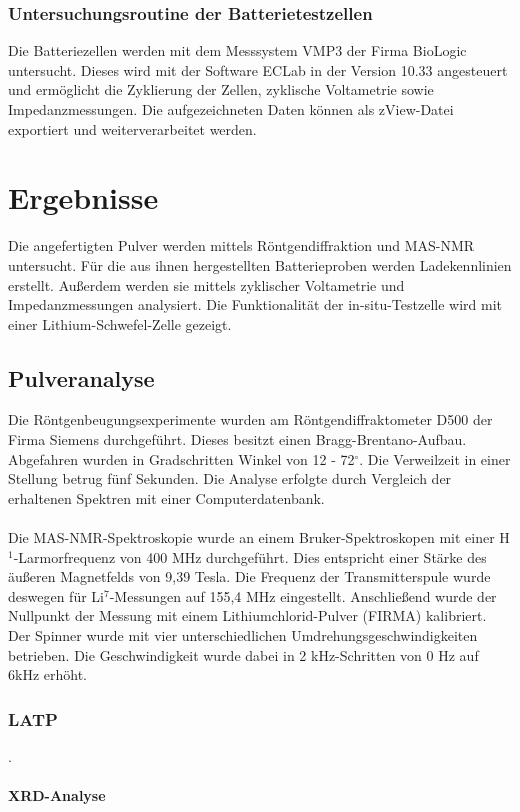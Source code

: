 \documentclass[a4paper, 11pt, headsepline,footsepline,twoside,abstract]{scrbook}
\begin{document}
\subsection{Untersuchungsroutine der Batterietestzellen} %
Die Batteriezellen werden mit dem Messsystem VMP3 der Firma BioLogic untersucht. Dieses wird mit der Software ECLab in der Version 10.33 angesteuert und ermöglicht die Zyklierung der Zellen, zyklische Voltametrie sowie Impedanzmessungen. Die aufgezeichneten Daten können als zView-Datei exportiert und weiterverarbeitet werden.
\chapter{Ergebnisse}
Die angefertigten Pulver werden mittels Röntgendiffraktion und MAS-NMR untersucht. Für die aus ihnen hergestellten Batterieproben werden Ladekennlinien erstellt. Außerdem werden sie mittels zyklischer Voltametrie und Impedanzmessungen analysiert. Die Funktionalität der in-situ-Testzelle wird mit einer Lithium-Schwefel-Zelle gezeigt.
\section{Pulveranalyse}
Die Röntgenbeugungsexperimente wurden am Röntgendiffraktometer D500 der Firma Siemens durchgeführt. Dieses besitzt einen Bragg-Brentano-Aufbau. Abgefahren wurden in Gradschritten Winkel von 12 - 72$^\circ$. Die Verweilzeit in einer Stellung betrug fünf Sekunden. Die Analyse erfolgte durch Vergleich der erhaltenen Spektren mit einer Computerdatenbank.
\\\\
Die MAS-NMR-Spektroskopie wurde an einem Bruker-Spektroskopen mit einer H$^1$-Larmor\-frequenz von 400 MHz durchgeführt. Dies entspricht einer Stärke des äußeren Magnetfelds von 9,39 Tesla. Die Frequenz der Transmitterspule wurde deswegen für Li$^7$-Messungen auf 155,4 MHz eingestellt. Anschließend wurde der Nullpunkt der Messung mit einem Lithiumchlorid-Pulver (FIRMA) kalibriert. Der Spinner wurde mit vier unterschiedlichen Umdrehungsgeschwindigkeiten betrieben. Die Geschwindigkeit wurde dabei in 2 kHz-Schritten von 0 Hz auf 6kHz erhöht.
\subsection{LATP}
.
\subsubsection{XRD-Analyse}
\end{document}
